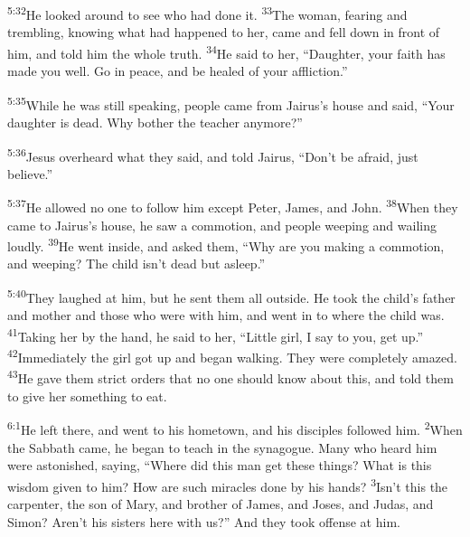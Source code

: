 \documentclass[openany,12pt,english]{book}
\newenvironment{para}{\par\pretolerance=100\tolerance=200\setlength{\emergencystretch}{0.6em}\relax}{\par}
\begin{document}
\begin{para}
    \textsuperscript{5:32}\thinspace{}He looked a\-round to see who had done it.
    \textsuperscript{33}\thinspace{}The wom\-an, fearing and trem\-bling, know\-ing what had happened to her, came and fell down in front of him, and told him the whole truth.
    \textsuperscript{34}\thinspace{}He said to her, “Daugh\-ter, your faith has made you well. Go in peace, and be healed of your af\-flic\-tion.”
\end{para}

\begin{para}
    \textsuperscript{5:35}\thinspace{}While he was still speak\-ing, peo\-ple came from Jairus's house and said, “Your daugh\-ter is dead. Why both\-er the teach\-er any\-more?”
\end{para}

\begin{para}
    \textsuperscript{5:36}\thinspace{}Jesus o\-ver\-heard what they said, and told Jairus, “Don't be a\-fraid, just be\-lieve.”
\end{para}

\begin{para}
    \textsuperscript{5:37}\thinspace{}He al\-lowed no one to fol\-low him ex\-cept Pe\-ter, James, and John.
    \textsuperscript{38}\thinspace{}When they came to Jairus's house, he saw a com\-mo\-tion, and peo\-ple weep\-ing and wailing loud\-ly.
    \textsuperscript{39}\thinspace{}He went in\-side, and asked them, “Why are you mak\-ing a com\-mo\-tion, and weep\-ing? The child is\-n't dead but a\-sleep.”
\end{para}

\begin{para}
    \textsuperscript{5:40}\thinspace{}They laughed at him, but he sent them all out\-side. He took the child's fa\-ther and moth\-er and those who were with him, and went in to where the child was.
    \textsuperscript{41}\thinspace{}Tak\-ing her by the hand, he said to her, “Lit\-tle girl, I say to you, get up.”
    \textsuperscript{42}\thinspace{}Im\-me\-di\-ate\-ly the girl got up and be\-gan walk\-ing. They were com\-plete\-ly a\-mazed.
    \textsuperscript{43}\thinspace{}He gave them strict orders that no one should know a\-bout this, and told them to give her some\-thing to eat.
\end{para}

\bigskip{}

\begin{para}
    \textsuperscript{6:1}\thinspace{}He left there, and went to his home\-town, and his disciples followed him.
    \textsuperscript{2}\thinspace{}When the Sabbath came, he be\-gan to teach in the syn\-a\-gogue. Man\-y who heard him were astonished, say\-ing, “Where did this man get these things? What is this wis\-dom giv\-en to him? How are such miracles done by his hands?
    \textsuperscript{3}\thinspace{}Is\-n't this the car\-pen\-ter, the son of Mar\-y, and broth\-er of James, and Joses, and Ju\-das, and Simon? Aren't his sisters here with us?” And they took of\-fense at him.
\end{para}
\end{document}
